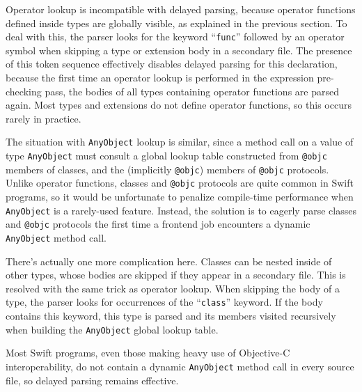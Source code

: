 \documentclass[a4paper,headsepline,bibliography=totoc,toc=flat,fleqn,twoside=semi]{scrbook}
\theoremstyle{definition}
\theoremstyle{definition}
\theoremstyle{definition}
\begin{document}
Operator lookup is incompatible with delayed parsing, because operator functions defined inside types are globally visible, as explained in the previous section. To deal with this, the parser looks for the keyword ``\texttt{func}'' followed by an operator symbol when skipping a type or extension body in a secondary file. The presence of this token sequence effectively disables delayed parsing for this declaration, because the first time an operator lookup is performed in the expression pre-checking pass, the bodies of all types containing operator functions are parsed again. Most types and extensions do not define operator functions, so this occurs rarely in practice.

The situation with \texttt{AnyObject} lookup is similar, since a method call on a value of type \texttt{AnyObject} must consult a global lookup table constructed from \texttt{@objc} members of classes, and the (implicitly \texttt{@objc}) members of \texttt{@objc} protocols.  Unlike operator functions, classes and \texttt{@objc} protocols are quite common in Swift programs, so it would be unfortunate to penalize compile-time performance when \texttt{AnyObject} is a rarely-used feature. Instead, the solution is to eagerly parse classes and \texttt{@objc} protocols the first time a frontend job encounters a dynamic \texttt{AnyObject} method call.

There's actually one more complication here. Classes can be nested inside of other types, whose bodies are skipped if they appear in a secondary file. This is resolved with the same trick as operator lookup. When skipping the body of a type, the parser looks for occurrences of the ``\texttt{class}'' keyword. If the body contains this keyword, this type is parsed and its members visited recursively when building the \texttt{AnyObject} global lookup table.

Most Swift programs, even those making heavy use of Objective-C interoperability, do not contain a dynamic \texttt{AnyObject} method call in every source file, so delayed parsing remains effective.
\end{document}

